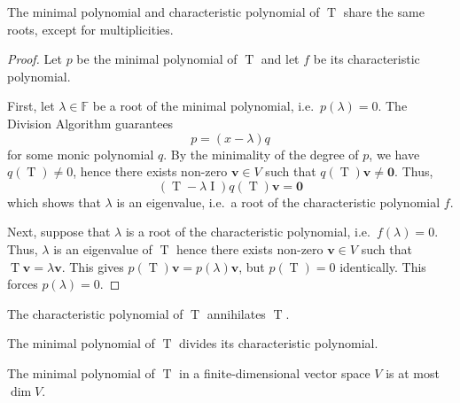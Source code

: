 \documentclass[11pt]{article}
\newcommand{\F}{\mathbb{F}}
\renewcommand{\vec}[1]{\boldsymbol{#1}}
\newcommand{\vv}{\vec{v}}
\newcommand{\op}[1]{\operatorname{#1}}
\newcommand{\opI}{\op{I}}
\newcommand{\opT}{\op{T}}
\newcommand{\dim}{\operatorname{dim}}
\theoremstyle{definition}
\theoremstyle{remark}
\numberwithin{equation}{section}
\begin{document}
    \begin{theorem}
        The minimal polynomial and characteristic polynomial of $\opT$ share the same
        roots, except for multiplicities.
    \end{theorem}
    \begin{proof}
        Let $p$ be the minimal polynomial of $\opT$ and let $f$ be its characteristic
        polynomial.

        First, let $\lambda \in \F$ be a root of the minimal polynomial, i.e.\
        $p(\lambda) = 0$. The Division Algorithm guarantees \[
            p = (x - \lambda)q
        \] for some monic polynomial $q$. By the minimality of the degree of $p$, we
        have $q(\opT) \neq 0$, hence there exists non-zero $\vv \in V$ such that
        $q(\opT)\vv \neq \vec{0}$. Thus, \[
            (\opT - \lambda\opI)q(\opT)\vv = \vec{0}
        \] which shows that $\lambda$ is an eigenvalue, i.e.\ a root of the
        characteristic polynomial $f$.

        Next, suppose that $\lambda$ is a root of the characteristic polynomial,
        i.e.\ $f(\lambda) = 0$. Thus, $\lambda$ is an eigenvalue of $\opT$ hence
        there exists non-zero $\vv \in V$ such that $\opT\vv = \lambda\vv$. This
        gives $p(\opT)\vv = p(\lambda)\vv$, but $p(\opT) = 0$ identically. This
        forces $p(\lambda) = 0$.
    \end{proof}

    \begin{theorem}
        The characteristic polynomial of $\opT$ annihilates $\opT$.
    \end{theorem}
    \begin{corollary}
        The minimal polynomial of $\opT$ divides its characteristic polynomial.
    \end{corollary}
    \begin{corollary}
        The minimal polynomial of $\opT$ in a finite-dimensional vector space $V$ is
        at most $\dim{V}$.
    \end{corollary}

    
\end{document}
